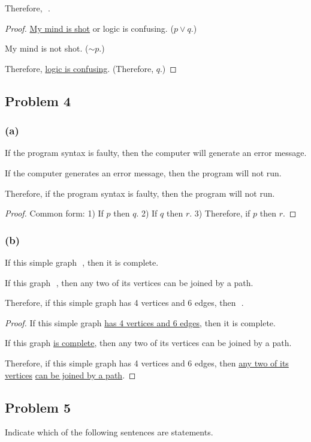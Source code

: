 \documentclass[14pt]{extarticle}
\newcommand{\fbl}{\underline{\hspace{1cm}}\,\,}
\begin{document}
Therefore, \fbl.

\begin{proof}
\underline{My mind is shot} or logic is confusing. ($p \vee q$.)

My mind is not shot. ($\sim p$.)

Therefore, \underline{logic is confusing}. (Therefore, $q$.)
\end{proof}

\subsection{Problem 4}
\subsubsection{(a)}
If the program syntax is faulty, then the computer will generate an error
message.

If the computer generates an error message, then the program will not run.

Therefore, if the program syntax is faulty, then the program will not run.

\begin{proof}
Common form: 1) If $p$ then $q$. 2) If $q$ then $r$. 3) Therefore, if $p$ then
$r$.
\end{proof}

\subsubsection{(b)}
If this simple graph \fbl, then it is complete.

If this graph \fbl, then any two of its vertices can be joined by a path.

Therefore, if this simple graph has 4 vertices and 6 edges, then \fbl.

\begin{proof}
If this simple graph \underline{has 4 vertices and 6 edges}, then it is
complete.

If this graph \underline{is complete}, then any two of its vertices can be
joined by a path.

Therefore, if this simple graph has 4 vertices and 6 edges, then
\underline{any two of its vertices} \underline{can be joined by a path}.
\end{proof}

\subsection{Problem 5}
Indicate which of the following sentences are statements.
\end{document}
